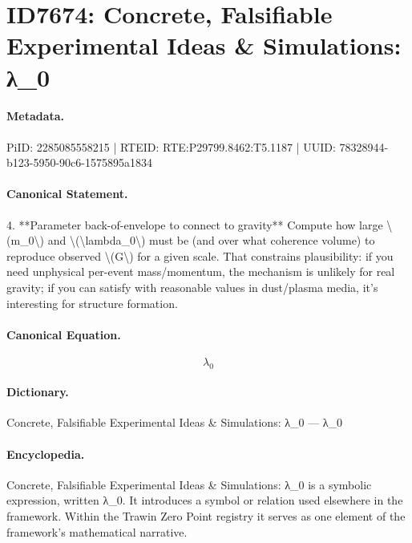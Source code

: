 \section*{ID7674: Concrete, Falsifiable Experimental Ideas \& Simulations: λ\_0}
\paragraph{Metadata.}
PiID: 2285085558215 | RTEID: RTE:P29799.8462:T5.1187 | UUID: 78328944-b123-5950-90c6-1575895a1834

\paragraph{Canonical Statement.}
4. **Parameter back-of-envelope to connect to gravity** Compute how large \textbackslash{}(m\_0\textbackslash{}) and \textbackslash{}(\textbackslash{}lambda\_0\textbackslash{}) must be (and over what coherence volume) to reproduce observed \textbackslash{}(G\textbackslash{}) for a given scale. That constrains plausibility: if you need unphysical per-event mass/momentum, the mechanism is unlikely for real gravity; if you can satisfy with reasonable values in dust/plasma media, it’s interesting for structure formation.

\paragraph{Canonical Equation.}
\[
\lambda_0
\]

\paragraph{Dictionary.}
Concrete, Falsifiable Experimental Ideas \& Simulations: λ\_0 — λ\_0

\paragraph{Encyclopedia.}
Concrete, Falsifiable Experimental Ideas \& Simulations: λ\_0 is a symbolic expression, written λ\_0. It introduces a symbol or relation used elsewhere in the framework. Within the Trawin Zero Point registry it serves as one element of the framework's mathematical narrative.
